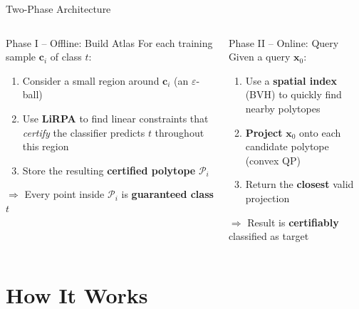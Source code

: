 \documentclass[aspectratio=169, 11pt]{beamer}
\newcommand{\vx}{\mathbf{x}}
\newcommand{\PP}{\mathcal{P}}
\begin{document}
\begin{frame}{Two-Phase Architecture}

\begin{columns}[T]
\begin{block}{Phase I -- Offline: Build Atlas}
  For each training sample $\mathbf{c}_i$ of class $t$:
  \begin{enumerate}
    \item Consider a small region around $\mathbf{c}_i$ (an $\varepsilon$-ball)
    \item Use \textbf{LiRPA} to find linear constraints that \emph{certify} the classifier predicts $t$ throughout this region
    \item Store the resulting \textbf{certified polytope} $\PP_i$
  \end{enumerate}
  \medskip
  $\Rightarrow$ Every point inside $\PP_i$ is \textbf{guaranteed class $t$}
\end{block}

\begin{block}{Phase II -- Online: Query}
  Given a query $\vx_0$:
  \begin{enumerate}
    \item Use a \textbf{spatial index} (BVH) to quickly find nearby polytopes
    \item \textbf{Project} $\vx_0$ onto each candidate polytope (convex QP)
    \item Return the \textbf{closest} valid projection
  \end{enumerate}
  \medskip
  $\Rightarrow$ Result is \textbf{certifiably} classified as target
\end{block}
\end{columns}

\end{frame}

\section{How It Works}
\end{document}
